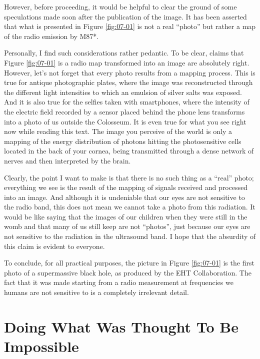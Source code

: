 However, before proceeding, it would be helpful to clear the ground of some speculations
made soon after the publication of the image. It has been asserted that what is
presented in Figure \ref{fig:07-01} is not a real ``photo'' but rather a map of the radio emission
by M87*.

Personally, I find such considerations rather pedantic. To be clear, claims that Figure
\ref{fig:07-01} is a radio map transformed into an image are absolutely right. However, let's not
forget that every photo results from a mapping process. This is true for antique
photographic plates, where the image was reconstructed through the different light
intensities to which an emulsion of silver salts was exposed. And it is also true for
the selfies taken with smartphones, where the intensity of the electric field recorded
by a sensor placed behind the phone lens transforms into a photo of us outside the
Colosseum. It is even true for what you see right now while reading this text. The image
you perceive of the world is only a mapping of the energy distribution of
photons hitting the photosensitive cells located in the back of your
cornea, being transmitted through a dense network of nerves and then interpreted by the
brain.

Clearly, the point I want to make is that there is no such thing as a ``real'' photo;
everything we see is the result of the mapping of signals received and processed into an
image. And although it is undeniable that our eyes are not sensitive to the radio band,
this does not mean we cannot take a photo from this radiation. It would be like saying
that the images of our children when they were still in the womb and that many of us
still keep are not ``photos'', just because our eyes are not sensitive to the radiation
in the ultrasound band. I hope that the absurdity of this claim is evident to everyone.

To conclude, for all practical purposes, the picture in Figure \ref{fig:07-01} is the first photo of
a supermassive black hole, as produced by the EHT Collaboration. The fact that it was
made starting from a radio measurement at frequencies we humans are not sensitive to is
a completely irrelevant detail.

\section{Doing What Was Thought To Be Impossible}\label{sec:07-impossible}


